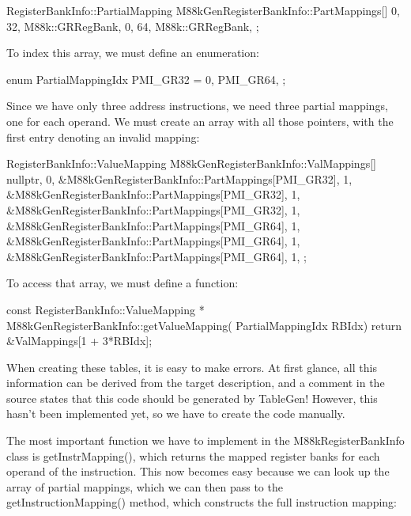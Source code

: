 \begin{cpp}
RegisterBankInfo::PartialMapping
    M88kGenRegisterBankInfo::PartMappings[]{
        {0, 32, M88k::GRRegBank},
        {0, 64, M88k::GRRegBank},
    };
\end{cpp}

To index this array, we must define an enumeration:

\begin{cpp}
enum PartialMappingIdx { PMI_GR32 = 0, PMI_GR64, };
\end{cpp}

Since we have only three address instructions, we need three partial mappings, one for each operand. We must create an array with all those pointers, with the first entry denoting an invalid mapping:

\begin{cpp}
RegisterBankInfo::ValueMapping
    M88kGenRegisterBankInfo::ValMappings[]{
        {nullptr, 0},
        {&M88kGenRegisterBankInfo::PartMappings[PMI_GR32], 1},
        {&M88kGenRegisterBankInfo::PartMappings[PMI_GR32], 1},
        {&M88kGenRegisterBankInfo::PartMappings[PMI_GR32], 1},
        {&M88kGenRegisterBankInfo::PartMappings[PMI_GR64], 1},
        {&M88kGenRegisterBankInfo::PartMappings[PMI_GR64], 1},
        {&M88kGenRegisterBankInfo::PartMappings[PMI_GR64], 1},
    };
\end{cpp}

To access that array, we must define a function:

\begin{cpp}
const RegisterBankInfo::ValueMapping *
M88kGenRegisterBankInfo::getValueMapping(
        PartialMappingIdx RBIdx) {
    return &ValMappings[1 + 3*RBIdx];
}
\end{cpp}

When creating these tables, it is easy to make errors. At first glance, all this information can be derived from the target description, and a comment in the source states that this code should be generated by TableGen! However, this hasn’t been implemented yet, so we have to create the code manually.

The most important function we have to implement in the M88kRegisterBankInfo class is getInstrMapping(), which returns the mapped register banks for each operand of the instruction. This now becomes easy because we can look up the array of partial mappings, which we can then pass to the getInstructionMapping() method, which constructs the full instruction mapping:

